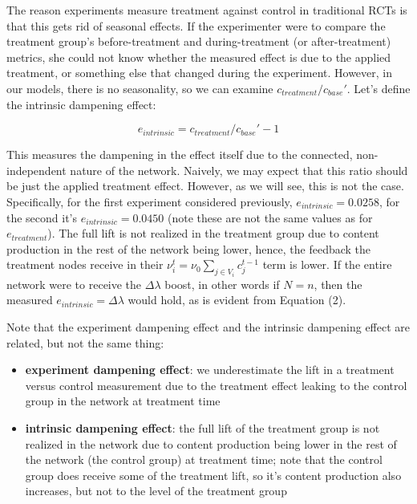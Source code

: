\documentclass[final,5p,times,twocolumn,authoryear]{elsarticle}
\begin{document}
The reason experiments measure treatment against control in traditional RCTs is that this gets rid of seasonal effects. If the experimenter were to compare the treatment group's before-treatment and during-treatment (or after-treatment) metrics, she could not know whether the measured effect is due to the applied treatment, or something else that changed during the experiment. However, in our models, there is no seasonality, so we can examine $c_{treatment}/c_{base}\prime$. Let's define the intrinsic dampening effect:

\begin{equation}
e_{intrinsic} = c_{treatment} / c_{base}\prime - 1
\end{equation}

This measures the dampening in the effect itself due to the connected, non-independent nature of the network. Naively, we may expect that this ratio should be just the applied treatment effect. However, as we will see, this is not the case. Specifically, for the first experiment considered previously, $e_{intrinsic} = 0.0258$, for the second it's $e_{intrinsic} = 0.0450$ (note these are not the same values as for $e_{treatment}$). The full lift is not realized in the treatment group due to content production in the rest of the network being lower, hence, the feedback the treatment nodes receive in their $\nu_i^t = \nu_0 \sum_{j \in V_i}{c_j^{t-1}}$ term is lower. If the entire network were to receive the $\Delta \lambda$ boost, in other words if $N=n$, then the measured $e_{intrinsic} = \Delta \lambda$ would hold, as is evident from Equation (2).

Note that the experiment dampening effect and the intrinsic dampening effect are related, but not the same thing:

\begin{itemize}
\setlength\itemsep{0em}
    \item \textbf{experiment dampening effect}: we underestimate the lift in a treatment versus control measurement due to the treatment effect leaking to the control group in the network at treatment time
    \item \textbf{intrinsic dampening effect}: the full lift of the treatment group is not realized in the network due to content production being lower in the rest of the network (the control group) at treatment time; note that the control group does receive some of the treatment lift, so it's content production also increases, but not to the level of the treatment group
\end{itemize}
\end{document}
